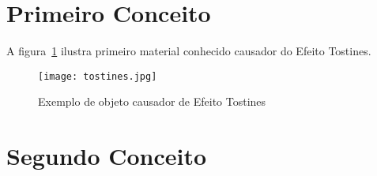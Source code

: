 \section[Conceito1]{Primeiro Conceito}

\blindtext

\blindtext[2]

\blindtext

A figura~\ref{fig-tostines} ilustra primeiro material conhecido causador do Efeito Tostines.

\begin{figure}[!htb]
	\centering
	\texttt{[image: tostines.jpg]}
	\caption{Exemplo de objeto causador de Efeito Tostines}
	\label{fig-tostines}
\end{figure}

\blindtext[2]




\section[Conceito2]{Segundo Conceito}

\blindtext

\blindtext[2]

\blindtext
		

